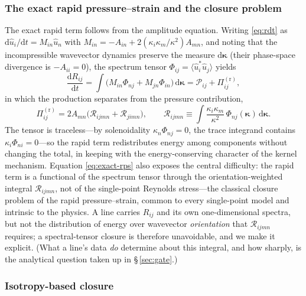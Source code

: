 \documentclass[lineno]{JFM-FLM_Au}
\begin{document}
\subsubsection{The exact rapid pressure--strain and the closure problem}
\label{sec:closure-problem}

The exact rapid term follows from the amplitude equation. Writing
\eqref{eq:rdt} as $\mathrm{d}\hat u_i/\mathrm{d}t=M_{in}\hat u_n$ with
$M_{in}=-A_{in}+2(\kappa_i\kappa_m/\kappa^2)A_{mn}$, and noting that the
incompressible wavevector dynamics preserve the measure
$\mathrm{d}\boldsymbol{\kappa}$ (their phase-space divergence is
$-A_{ii}=0$), the spectrum tensor
$\Phi_{ij}=\langle\hat u_i^{*}\hat u_j\rangle$ yields
\begin{equation}
  \frac{\mathrm{d}R_{ij}}{\mathrm{d}t}
  = \int\!\big(M_{in}\Phi_{nj}+M_{jn}\Phi_{in}\big)\,
    \mathrm{d}\boldsymbol{\kappa}
  = \mathcal{P}_{ij} + \Pi^{(\mathrm r)}_{ij},
  \label{eq:dRdt-rdt}
\end{equation}
in which the production separates from the pressure contribution,
\begin{equation}
  \Pi^{(\mathrm r)}_{ij}
  = 2A_{mn}\big(\mathcal{R}_{ijmn}+\mathcal{R}_{jimn}\big),
  \qquad
  \mathcal{R}_{ijmn} \equiv
  \int \frac{\kappa_i \kappa_m}{\kappa^2}\,
  \Phi_{nj}(\boldsymbol{\kappa})\,\mathrm{d}\boldsymbol{\kappa}.
  \label{eq:exact-rps}
\end{equation}
The tensor is traceless---by solenoidality $\kappa_n\Phi_{nj}=0$, the
trace integrand contains $\kappa_i\Phi_{ni}=0$---so the rapid term
redistributes energy among components without changing the total, in
keeping with the energy-conserving character of the kernel mechanism.
Equation \eqref{eq:exact-rps} also exposes the central difficulty: the
rapid term is a functional of the spectrum tensor through the
orientation-weighted integral $\mathcal{R}_{ijmn}$, not of the
single-point Reynolds stress---the classical closure problem of the rapid
pressure--strain, common to every single-point model
\citep{Crow1968,LaunderReeceRodi1975,Pope2000} and intrinsic to the
physics. A line carries $R_{ij}$ and its own one-dimensional spectra, but
not the distribution of energy over wavevector \emph{orientation} that
$\mathcal{R}_{ijmn}$ requires; a spectral-tensor closure is therefore
unavoidable, and we make it explicit. (What a line's data \emph{do}
determine about this integral, and how sharply, is the analytical
question taken up in \S\,\ref{sec:gate}.)

\subsubsection{Isotropy-based closure}\label{sec:iso-closure}
\end{document}
